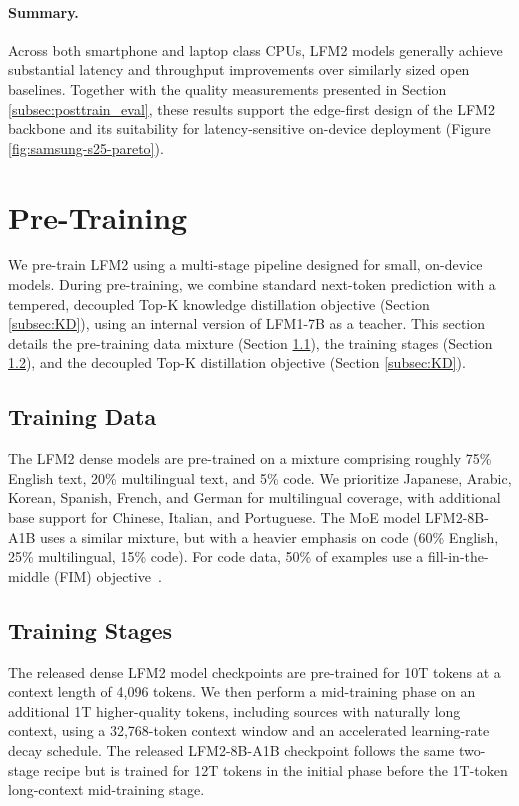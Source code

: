 \documentclass{article}
\begin{document}
\paragraph{Summary.}
Across both smartphone and laptop class CPUs, LFM2 models generally achieve substantial latency and throughput improvements over similarly sized open baselines. Together with the quality measurements presented in Section \ref{subsec:posttrain_eval}, these results support the edge-first design of the LFM2 backbone and its suitability for latency-sensitive on-device deployment (Figure \ref{fig:samsung-s25-pareto}).









\section{Pre-Training}
\label{sec:pretraining}

We pre-train LFM2 using a multi-stage pipeline designed for small, on-device models. During pre-training, we combine standard next-token prediction with a tempered, decoupled Top-K knowledge distillation objective (Section \ref{subsec:KD}), using an internal version of LFM1-7B as a teacher. This section details the pre-training data mixture (Section \ref{subsec:train_data}), the training stages (Section \ref{subsec:train_stages}), and the decoupled Top-K distillation objective (Section \ref{subsec:KD}).


\subsection{Training Data}
\label{subsec:train_data}
The LFM2 dense models are pre-trained on a mixture comprising roughly 75\% English text, 20\% multilingual text, and 5\% code. We prioritize Japanese, Arabic, Korean, Spanish, French, and German for multilingual coverage, with additional base support for Chinese, Italian, and Portuguese. The MoE model LFM2-8B-A1B uses a similar mixture, but with a heavier emphasis on code (60\% English, 25\% multilingual, 15\% code). For code data, 50\% of examples use a fill-in-the-middle (FIM) objective~\citep{bavarian2022efficient}.


\subsection{Training Stages}
\label{subsec:train_stages}
The released dense LFM2 model checkpoints are pre-trained for 10T tokens at a context length of 4,096 tokens. We then perform a mid-training phase on an additional 1T higher-quality tokens, including sources with naturally long context, using a 32,768-token context window and an accelerated learning-rate decay schedule. The released LFM2-8B-A1B checkpoint follows the same two-stage recipe but is trained for 12T tokens in the initial phase before the 1T-token long-context mid-training stage.
\end{document}
